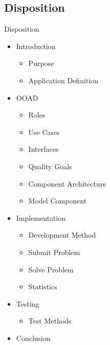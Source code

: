 \subsection*{Disposition}
\begin{frame}{Disposition}
\begin{itemize}
	
	
	\item Introduction
	\begin{itemize}
		\item Purpose 
		\item Application Definition 
	\end{itemize}
	\item<2-> OOAD 
	\begin{itemize}
		\item<2->  Roles 
		\item<2->  Use Cases 
		\item<2->  Interfaces 
		\item<2->  Quality Goals 
		\item<2->  Component Architecture 
		\item<2->  Model Component	
	\end{itemize}
	\item<3-> Implementation 
	\begin{itemize}
		\item<3-> Development Method 
		\item<3-> Submit Problem 
		\item<3-> Solve Problem 
		\item<3-> Statistics 
	\end{itemize}	
	\item<4-> Testing 
	\begin{itemize}
		\item<4-> Test Methods 
	\end{itemize}
	\item<5-> Conclusion 
\end{itemize}
\end{frame}